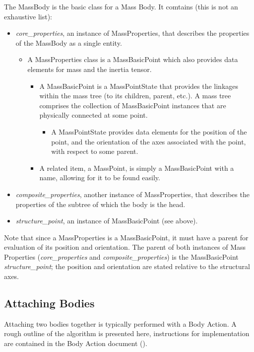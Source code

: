 The MassBody is the basic class for a Mass Body.  It comtains (this is not an
exhaustive list):
\begin{itemize}
 \item \textit{core\_properties}, an instance of MassProperties, that
 describes the properties of the MassBody as a single entity.
 \begin{itemize}
  \item A MassProperties class is a MassBasicPoint which also provides data
  elements for mass and the inertia tensor.
  \begin{itemize}
   \item A MassBasicPoint is a MassPointState that provides the linkages
   within the mass tree (to its children, parent, etc.).  A mass tree
   comprises the collection of MassBasicPoint instances that are physically
   connected at some point.
   \begin{itemize}
    \item A MassPointState provides data elements for the position of the
    point, and the orientation of the axes associated with the point, with
    respect to some parent.
   \end{itemize}
   \item A related item, a MassPoint, is simply a MassBasicPoint with a name,
   allowing for it to be found easily.
  \end{itemize}
  \end{itemize}


 \item \textit{composite\_properties}, another instance of MassProperties,
 that describes the properties of the subtree of which the body is the head.
 \item \textit{structure\_point}, an instance of MassBasicPoint (see above).
\end{itemize}

Note that since a MassProperties is a MassBasicPoint, it must have a parent
for evaluation of its position and orientation.  The parent of both instances
of Mass Properties (\textit{core\_properties} and
\textit{composite\_properties}) is the MassBasicPoint
\textit{structure\_point}; the position and orientation are stated relative to
the structural axes.


\subsection{Attaching Bodies}\label{sec:attaching_bodies}
Attaching two bodies together is typically performed with a Body Action.  A
rough outline of the algorithm is presented here, instructions for
implementation are contained in the Body Action document
(\cite{dynenv:DYNBODY}).

